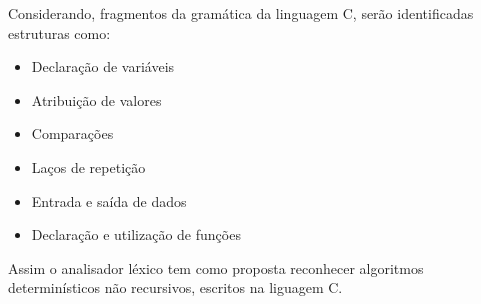 \par Considerando, fragmentos da gramática da linguagem C, serão identificadas estruturas como:

\begin{itemize}
\item Declaração de variáveis
\item Atribuição de valores
\item Comparações
\item Laços de repetição
\item Entrada e saída de dados
\item Declaração e utilização de funções
\end{itemize}


Assim o analisador léxico tem como proposta reconhecer algoritmos determinísticos não recursivos, escritos na liguagem C.

